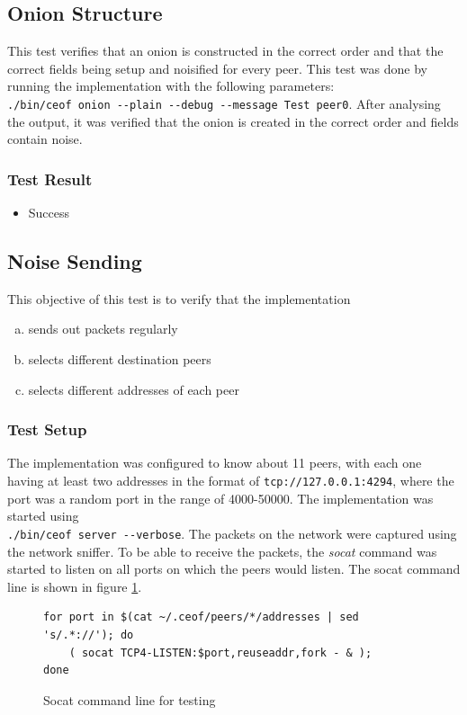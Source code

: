 \subsection{Onion Structure}
This test verifies that an onion is constructed in the correct order and that
the correct fields being setup and noisified for every peer.
This test was done by running the implementation with the following
parameters:\\ \verb=./bin/ceof onion --plain --debug --message Test peer0=.
After analysing the output, it was verified that the onion is created in the
correct order and fields contain noise.
\subsubsection{Test Result}
\begin{itemize}
\item Success
\end{itemize}
\subsection{Noise Sending}
\label{testnoisesending}
This objective of this test is to verify that the implementation
\begin{enumerate}[(a)]
\item sends out packets regularly 
\item selects different destination peers
\item selects different addresses of each peer
\end{enumerate}
\subsubsection{Test Setup}
The implementation was configured to know about 11 peers,
with each one having at least two addresses in the format
of \verb=tcp://127.0.0.1:4294=, where the port was a random
port in the range of 4000-50000.
The implementation was started using
\\ \verb=./bin/ceof server --verbose=. The packets
on the network were captured using the network sniffer.
To be able to receive the packets, the \textit{socat} command was started
to listen on all ports on which the peers would listen. The
socat command line is shown in figure \ref{socatlisten}.
\begin{figure}[htbp]
\caption{Socat command line for testing}
\label{socatlisten}
\begin{verbatim}
for port in $(cat ~/.ceof/peers/*/addresses | sed 's/.*://'); do
    ( socat TCP4-LISTEN:$port,reuseaddr,fork - & );
done
\end{verbatim}
\end{figure}
